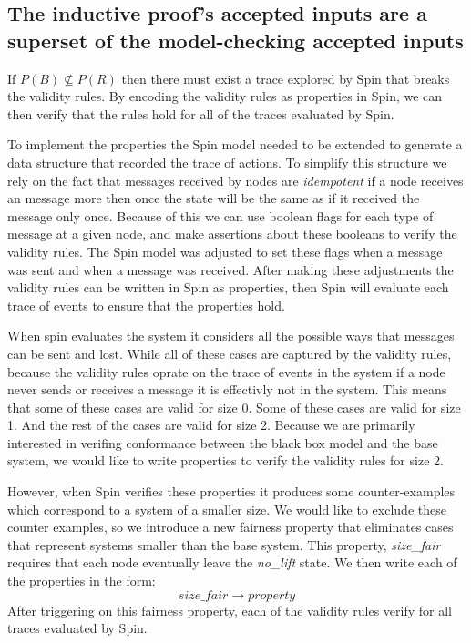 \documentclass[runningheads]{llncs}
\begin{document}
\subsection{The inductive proof's accepted inputs are a superset of the model-checking accepted inputs}
\label{sec:inputs_smaller}
If $P(B) \nsubseteq P(R)$ then there must exist a trace explored by Spin that breaks the validity rules. By encoding the validity rules as properties in Spin, we can then verify that the rules hold for all of the traces evaluated by Spin. 

To implement the properties the Spin model needed to be extended to generate a data structure that recorded the trace of actions. To simplify this structure we rely on the fact that messages received by nodes are \emph{idempotent} if a node receives an message more then once the state will be the same as if it received the message only once. Because of this we can use boolean flags for each type of message at a given node, and make assertions about these booleans to verify the validity rules. The Spin model was adjusted to set these flags when a message was sent and when a message was received. 
After making these adjustments the validity rules can be written in Spin as properties, then Spin will evaluate each trace of events to ensure that the properties hold. 

When spin evaluates the system it considers all the possible ways that messages can be sent and lost. While all of these cases are captured by the validity rules, because the validity rules oprate on the trace of events in the system if a node never sends or receives a message it is effectivly not in the system. This means that some of these cases are valid for size 0. Some of these cases are valid for size 1. And the rest of the cases are valid for size 2. Because we are primarily interested in verifing conformance between the black box model and the base system, we would like to write properties to verify the validity rules for size 2. 

However, when Spin verifies these properties it produces some counter-examples which correspond to a system of a smaller size. We would like to exclude these counter examples, so we introduce a new fairness property that eliminates cases that represent systems smaller than the base system. This property, \emph{size\_fair} requires that each node eventually leave the \emph{no\_lift} state. We then write each of the properties in the form:
$$size\_fair \longrightarrow property$$
After triggering on this fairness property, each of the validity rules verify for all traces evaluated by Spin. 
\end{document}
